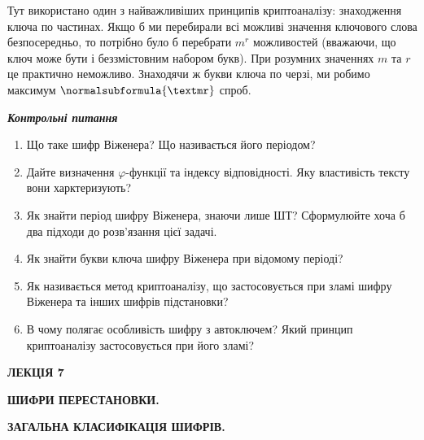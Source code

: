 Тут використано один з найважливіших принципів криптоаналізу: знаходження ключа
по частинах. Якщо б ми перебирали всі можливі значення ключового слова
безпосередньо, то потрібно було б перебрати  $m^r$ можливостей (вважаючи,
що ключ може бути і беззмістовним набором букв). При розумних значеннях  $m$
та  $r$ це практично неможливо. Знаходячи ж букви ключа по черзі, ми робимо
максимум  $\normalsubformula{\textmr}$ спроб.


\bigskip


\bigskip

{\centering\bfseries\itshape
Контрольні питання
\par}


\bigskip


\bigskip

\liststyleWWviiiNumxiii
\begin{enumerate}
\item Що таке шифр Віженера? Що називається його періодом?
\item Дайте визначення  $\varphi ${}-функції та індексу відповідності. Яку
властивість тексту вони харктеризують?
\item Як знайти період шифру Віженера, знаючи лише ШТ? Сформулюйте хоча б два
підходи до розв’язання цієї задачі.
\item Як знайти букви ключа шифру Віженера при відомому періоді?
\item Як називається метод криптоаналізу, що застосовується при зламі шифру
Віженера та інших шифрів підстановки?
\item В чому полягає особливість шифру з автоключем? Який принцип криптоаналізу
застосовується при його зламі?
\end{enumerate}

\bigskip


\bigskip


\bigskip


\bigskip


\bigskip


\bigskip


\bigskip


\bigskip


\bigskip


\bigskip

{\bfseries
ЛЕКЦІЯ 7}


\bigskip

{\centering\bfseries
ШИФРИ  ПЕРЕСТАНОВКИ.
\par}

{\centering\bfseries
ЗАГАЛЬНА  КЛАСИФІКАЦІЯ  ШИФРІВ.
\par}

